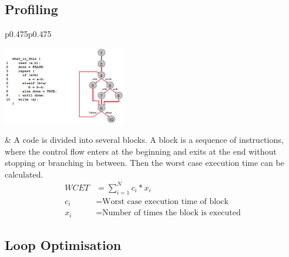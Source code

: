 	\subsection{Profiling}
		\begin{tabular}{p{0.475\textwidth}p{0.475\textwidth}}
			\vspace{0pt}
			
			\includegraphics[width=0.4\textwidth]{./pictures/profiling.png}
			
			&
			A code is divided into several blocks. A block is a sequence of instructions, where the control flow enters at the beginning and exits at the end without stopping or branching in between. Then the worst case execution time can be calculated.
			\begin{equation*}
				\begin{aligned}
					WCET &= \sum_{i=1}^{N} c_i * x_i \\
					c_i &= \text{Worst case execution time of block} \\
					x_i &= \text{Number of times the block is executed}
				\end{aligned}
			\end{equation*}			
		\end{tabular}
	
	\subsection{Loop Optimisation }	
		\begin{minipage}[t]{0.3\linewidth}		
			
		\end{minipage}
		\hfill
		\begin{minipage}[t]{0.3\linewidth}		
			
		\end{minipage}
		\hfill
		\begin{minipage}[t]{0.3\linewidth}		
			
		\end{minipage}	
				
